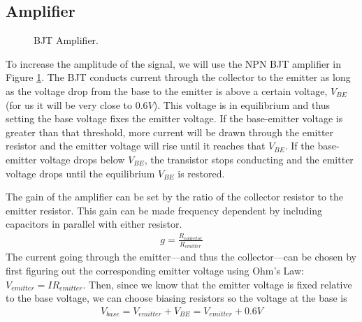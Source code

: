 \documentclass[12pt]{article}
\begin{document}
\subsection*{Amplifier}
\begin{figure}[H]
\caption{BJT Amplifier.}
\label{fig:amplifier_diagram}
\end{figure}

To increase the amplitude of the signal, we will use the NPN BJT amplifier in Figure \ref{fig:amplifier_diagram}. The BJT conducts current through the collector to the emitter as long as the voltage drop from the base to the emitter is above a certain voltage, $V_{BE}$ (for us it will be very close to $0.6V$). This voltage is in equilibrium and thus setting the base voltage fixes the emitter voltage. If the base-emitter voltage is greater than that threshold, more current will be drawn through the emitter resistor and the emitter voltage will rise until it reaches that $V_{BE}$. If the base-emitter voltage drops below $V_{BE}$, the transistor stops conducting and the emitter voltage drops until the equilibrium $V_{BE}$ is restored.

The gain of the amplifier can be set by the ratio of the collector resistor to the emitter resistor. This gain can be made frequency dependent by including capacitors in parallel with either resistor.
\begin{eqnarray}
g = \frac{R_{collector}}{R_{emitter}} \label{amplifiergain}
\end{eqnarray}
The current going through the emitter---and thus the collector---can be chosen by first figuring out the corresponding emitter voltage using Ohm's Law: $V_{emitter}=IR_{emitter}$. Then, since we know that the emitter voltage is fixed relative to the base voltage, we can choose biasing resistors so the voltage at the base is
\begin{eqnarray}
V_{base} = V_{emitter} + V_{BE} = V_{emitter} + 0.6V \label{vbase}
\end{eqnarray}
\end{document}
